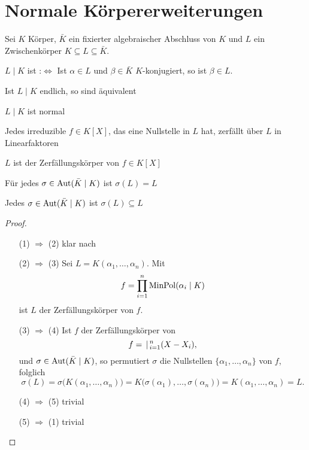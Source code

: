 \section{Normale Körpererweiterungen}
Sei $K$ Körper, $\bar K$ ein fixierter algebraischer Abschluss von $K$ und $L$ ein Zwischenkörper $K\subseteq L\subseteq \bar K$.

\begin{definition}
	$L\mid K$ ist  :$\Leftrightarrow$ Ist $\alpha\in L$ und $\beta\in\bar K$ $K$-konjugiert, so ist $\beta\in L$.
\end{definition}

\begin{proposition}
	Ist $L\mid K$ endlich, so sind äquivalent \begin{propenum}
		\item $L\mid K$ ist normal
		\item Jedes irreduzible $f\in K[X]$, das eine Nullstelle in $L$ hat, zerfällt über $L$ in Linearfaktoren
		\item $L$ ist der Zerfällungskörper von $f\in K[X]$
		\item {} Für jedes $\sigma\in\operatorname{Aut}(\bar K\mid K)$ ist $\sigma(L) = L$
		\item Jedes $\sigma\in\operatorname{Aut}(\bar K\mid K)$ ist $\sigma(L)\subseteq L$
	\end{propenum}
\end{proposition}

\begin{proof}\leavevmode
	\begin{itemize}[widest={(1) $\Rightarrow$ (2)},leftmargin=*,topsep=-6pt]
		\item[(1) $\Rightarrow$ (2)] klar nach 
		\item[(2) $\Rightarrow$ (3)] Sei $L = K(\alpha_1,\dots,\alpha_n)$. Mit \begin{equation*}
			f = \prod_{i=1}^n \operatorname{MinPol}(\alpha_i\mid K)
		\end{equation*}
		ist $L$ der Zerfällungskörper von $f$.
		\item[(3) $\Rightarrow$ (4)] Ist $f$ der Zerfällungskörper von\begin{equation*}
			f = \,|\,_{i=1}^n (X - X_i),
		\end{equation*}
		und $\sigma\in\operatorname{Aut}(\bar K\mid K)$, so permutiert $\sigma$ die Nullstellen $\lbrace \alpha_1,\dots,\alpha_n\rbrace$ von $f$, folglich \begin{equation*}
			\sigma(L) = \sigma\big( K(\alpha_1,\dots,\alpha_n)\big) = K\big(\sigma(\alpha_1),\dots,\sigma(\alpha_n)\big) = K(\alpha_1,\dots,\alpha_n) = L.
		\end{equation*}
		\item[(4) $\Rightarrow$ (5)] trivial
		\item[(5) $\Rightarrow$ (1)] trivial
	\end{itemize}
\end{proof}

